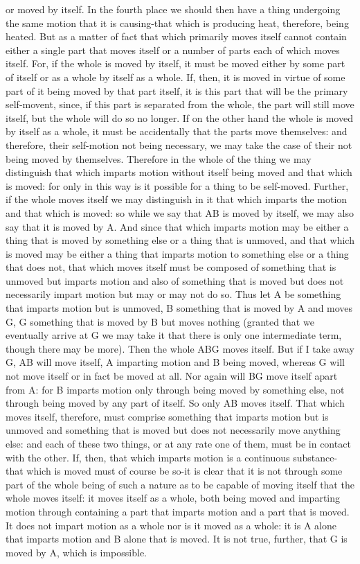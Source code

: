 or moved by itself. In the fourth place we should then have a thing
undergoing the same motion that it is causing-that which is producing
heat, therefore, being heated. But as a matter of fact that which
primarily moves itself cannot contain either a single part that moves
itself or a number of parts each of which moves itself. For, if the
whole is moved by itself, it must be moved either by some part of
itself or as a whole by itself as a whole. If, then, it is moved in
virtue of some part of it being moved by that part itself, it is this
part that will be the primary self-movent, since, if this part is
separated from the whole, the part will still move itself, but the
whole will do so no longer. If on the other hand the whole is moved
by itself as a whole, it must be accidentally that the parts move
themselves: and therefore, their self-motion not being necessary,
we may take the case of their not being moved by themselves. Therefore
in the whole of the thing we may distinguish that which imparts motion
without itself being moved and that which is moved: for only in this
way is it possible for a thing to be self-moved. Further, if the whole
moves itself we may distinguish in it that which imparts the motion
and that which is moved: so while we say that AB is moved by itself,
we may also say that it is moved by A. And since that which imparts
motion may be either a thing that is moved by something else or a
thing that is unmoved, and that which is moved may be either a thing
that imparts motion to something else or a thing that does not, that
which moves itself must be composed of something that is unmoved but
imparts motion and also of something that is moved but does not necessarily
impart motion but may or may not do so. Thus let A be something that
imparts motion but is unmoved, B something that is moved by A and
moves G, G something that is moved by B but moves nothing (granted
that we eventually arrive at G we may take it that there is only one
intermediate term, though there may be more). Then the whole ABG moves
itself. But if I take away G, AB will move itself, A imparting motion
and B being moved, whereas G will not move itself or in fact be moved
at all. Nor again will BG move itself apart from A: for B imparts
motion only through being moved by something else, not through being
moved by any part of itself. So only AB moves itself. That which moves
itself, therefore, must comprise something that imparts motion but
is unmoved and something that is moved but does not necessarily move
anything else: and each of these two things, or at any rate one of
them, must be in contact with the other. If, then, that which imparts
motion is a continuous substance-that which is moved must of course
be so-it is clear that it is not through some part of the whole being
of such a nature as to be capable of moving itself that the whole
moves itself: it moves itself as a whole, both being moved and imparting
motion through containing a part that imparts motion and a part that
is moved. It does not impart motion as a whole nor is it moved as
a whole: it is A alone that imparts motion and B alone that is moved.
It is not true, further, that G is moved by A, which is impossible.


